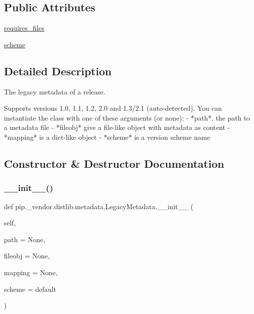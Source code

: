 \subsection*{Public Attributes}
\begin{DoxyCompactItemize}
\item 
\hyperlink{classpip_1_1__vendor_1_1distlib_1_1metadata_1_1LegacyMetadata_ae398f0d2a6e8c100aaa108b22500245b}{requires\+\_\+files}
\item 
\hyperlink{classpip_1_1__vendor_1_1distlib_1_1metadata_1_1LegacyMetadata_ab3f060c78a87e7f63c7d3dc1dcc1857e}{scheme}
\end{DoxyCompactItemize}


\subsection{Detailed Description}
\begin{DoxyVerb}The legacy metadata of a release.

Supports versions 1.0, 1.1, 1.2, 2.0 and 1.3/2.1 (auto-detected). You can
instantiate the class with one of these arguments (or none):
- *path*, the path to a metadata file
- *fileobj* give a file-like object with metadata as content
- *mapping* is a dict-like object
- *scheme* is a version scheme name
\end{DoxyVerb}
 

\subsection{Constructor \& Destructor Documentation}
\mbox{\label{classpip_1_1__vendor_1_1distlib_1_1metadata_1_1LegacyMetadata_a3870519deea05c5d4cfe0e4c5401f163}} 
\subsubsection{\texorpdfstring{\+\_\+\+\_\+init\+\_\+\+\_\+()}{\_\_init\_\_()}}
{\footnotesize\ttfamily def pip.\+\_\+vendor.\+distlib.\+metadata.\+Legacy\+Metadata.\+\_\+\+\_\+init\+\_\+\+\_\+ (\begin{DoxyParamCaption}\item[{}]{self,  }\item[{}]{path = {\ttfamily None},  }\item[{}]{fileobj = {\ttfamily None},  }\item[{}]{mapping = {\ttfamily None},  }\item[{}]{scheme = {\ttfamily \textquotesingle{}default\textquotesingle{}} }\end{DoxyParamCaption})}



